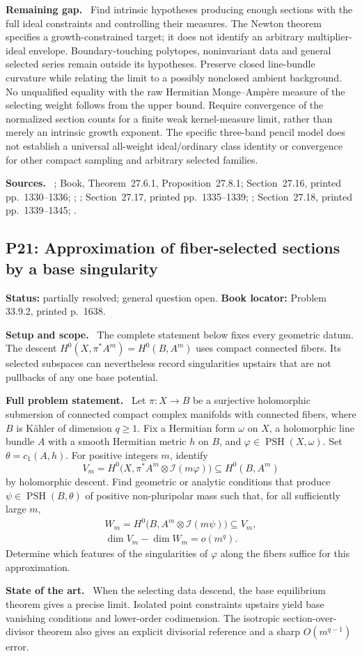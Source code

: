 \documentclass[11pt]{article}
\newcommand{\PSH}{\operatorname{PSH}}
\newcommand{\field}[1]{\par\medskip\noindent\textbf{#1.}\ }
\begin{document}
\field{Remaining gap} Find intrinsic hypotheses producing enough sections with the full ideal constraints and controlling their measures. The Newton theorem specifies a growth-constrained target; it does not identify an arbitrary multiplier-ideal envelope. Boundary-touching polytopes, noninvariant data and general selected series remain outside its hypotheses. Preserve closed line-bundle curvature while relating the limit to a possibly nonclosed ambient background. No unqualified equality with the raw Hermitian Monge--Amp\`ere measure of the selecting weight follows from the upper bound. Require convergence of the normalized section counts for a finite weak kernel-measure limit, rather than merely an intrinsic growth exponent. The specific three-band pencil model does not establish a universal all-weight ideal/ordinary class identity or convergence for other compact sampling and arbitrary selected families.
\field{Sources} \cite{SGPT}; Book, Theorem~27.6.1, Proposition~27.8.1; Section~27.16, printed pp.~1330--1336; ; ; Section~27.17, printed pp.~1335--1339; ; Section~27.18, printed pp.~1339--1345; .
\subsection{P21: Approximation of fiber-selected sections by a base singularity}
\label{P21}
\noindent\textbf{Status:} partially resolved; general question open. \textbf{Book locator:} Problem 33.9.2, printed p.~1638.
\field{Setup and scope} The complete statement below fixes every geometric datum. The descent $H^0(X,\pi^*A^m)=H^0(B,A^m)$ uses compact connected fibers. Its selected subspaces can nevertheless record singularities upstairs that are not pullbacks of any one base potential.
\field{Full problem statement} Let $\pi:X\to B$ be a surjective holomorphic submersion of connected compact complex manifolds with connected fibers, where $B$ is K\"ahler of dimension $q\geq1$. Fix a Hermitian form $\omega$ on $X$, a holomorphic line bundle $A$ with a smooth Hermitian metric $h$ on $B$, and $\varphi\in\PSH(X,\omega)$. Set $\theta=c_1(A,h)$. For positive integers $m$, identify
\[
 V_m=H^0\bigl(X,\pi^*A^m\otimes\mathcal I(m\varphi)\bigr)
          \subseteq H^0(B,A^m)
\]
by holomorphic descent. Find geometric or analytic conditions that produce $\psi\in\PSH(B,\theta)$ of positive non-pluripolar mass such that, for all sufficiently large $m$,
\[
 \begin{gathered}
 W_m=H^0\bigl(B,A^m\otimes\mathcal I(m\psi)\bigr)\subseteq V_m,\\
 \dim V_m-\dim W_m=o(m^q).
 \end{gathered}
\]
Determine which features of the singularities of $\varphi$ along the fibers suffice for this approximation.
\field{State of the art} When the selecting data descend, the base equilibrium theorem gives a precise limit. Isolated point constraints upstairs yield base vanishing conditions and lower-order codimension. The isotropic section-over-divisor theorem also gives an explicit divisorial reference and a sharp $O(m^{q-1})$ error.
\end{document}

